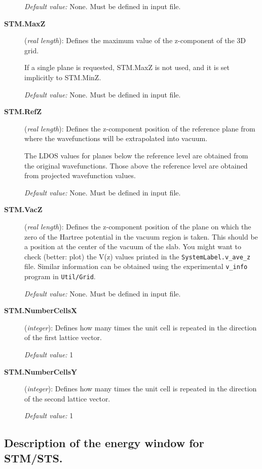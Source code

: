 \begin{description}
 {\it Default value:} None. Must be defined in input file.


\item[{\bf STM.MaxZ}] ({\it real length}):
 Defines the maximum value of the z-component of the 3D grid.

If a single plane is requested, STM.MaxZ is not used, and it is
set implicitly to STM.MinZ.

{\it Default value:} None. Must be defined in input file.


\item[{\bf STM.RefZ}] ({\it real length}):
 Defines the z-component position of the reference plane from
 where the wavefunctions will be extrapolated into vacuum.

 The LDOS values for planes below the reference level are obtained
 from the original wavefunctions. Those above the reference level are
 obtained from projected wavefunction values.

{\it Default value:} None. Must be defined in input file.

\item[{\bf STM.VacZ}] ({\it real length}):
 Defines the z-component position of the plane on which the
 zero of the Hartree potential in the vacuum region is taken.
 This should be a position at the center of the vacuum of the slab.
 You might want to check (better: plot) the V(z) values printed in the
 {\tt SystemLabel.v\_ave\_z} file. Similar information can be obtained
 using the experimental {\tt v\_info} program in {\tt Util/Grid}.
 
{\it Default value:} None. Must be defined in input file.

\item[{\bf STM.NumberCellsX}] ({\it integer}):
Defines how many times the unit cell is repeated
in the direction of the first lattice vector.

{\it Default value:} 1

\item[{\bf STM.NumberCellsY}] ({\it integer}):
Defines how many times the unit cell is repeated
in the direction of the second lattice vector.

{\it Default value:} 1

\end{description}

\vspace{5pt}
\subsection{Description of the energy window for STM/STS.}

